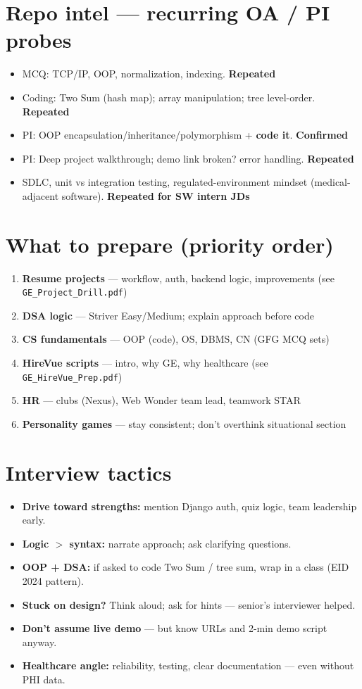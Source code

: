 \documentclass[11pt,a4paper]{article}
\newcommand{\tg}[1]{\textcolor{tag}{\textbf{\footnotesize #1}}}
\begin{document}
\section{Repo intel --- recurring OA / PI probes}
\begin{itemize}
  \item MCQ: TCP/IP, OOP, normalization, indexing. \tg{Repeated}
  \item Coding: Two Sum (hash map); array manipulation; tree level-order. \tg{Repeated}
  \item PI: OOP encapsulation/inheritance/polymorphism + \textbf{code it}. \tg{Confirmed}
  \item PI: Deep project walkthrough; demo link broken? error handling. \tg{Repeated}
  \item SDLC, unit vs integration testing, regulated-environment mindset (medical-adjacent software). \tg{Repeated for SW intern JDs}
\end{itemize}

\section{What to prepare (priority order)}
\begin{enumerate}
  \item \textbf{Resume projects} --- workflow, auth, backend logic, improvements (see \texttt{GE\_Project\_Drill.pdf})
  \item \textbf{DSA logic} --- Striver Easy/Medium; explain approach before code
  \item \textbf{CS fundamentals} --- OOP (code), OS, DBMS, CN (GFG MCQ sets)
  \item \textbf{HireVue scripts} --- intro, why GE, why healthcare (see \texttt{GE\_HireVue\_Prep.pdf})
  \item \textbf{HR} --- clubs (Nexus), Web Wonder team lead, teamwork STAR
  \item \textbf{Personality games} --- stay consistent; don't overthink situational section
\end{enumerate}

\section{Interview tactics}
\begin{itemize}
  \item \textbf{Drive toward strengths:} mention Django auth, quiz logic, team leadership early.
  \item \textbf{Logic $>$ syntax:} narrate approach; ask clarifying questions.
  \item \textbf{OOP + DSA:} if asked to code Two Sum / tree sum, wrap in a class (EID 2024 pattern).
  \item \textbf{Stuck on design?} Think aloud; ask for hints --- senior's interviewer helped.
  \item \textbf{Don't assume live demo} --- but know URLs and 2-min demo script anyway.
  \item \textbf{Healthcare angle:} reliability, testing, clear documentation --- even without PHI data.
\end{itemize}
\end{document}
